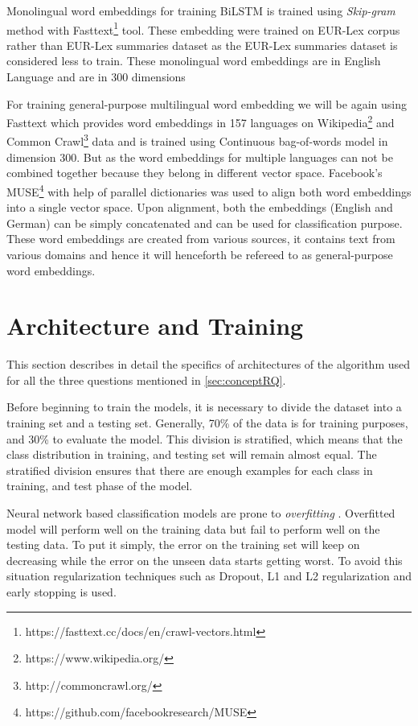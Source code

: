 Monolingual word embeddings for training \gls{BiLSTM} is trained using \textit{Skip-gram} method with Fasttext\footnote{https://fasttext.cc/docs/en/crawl-vectors.html}\cite{graves2009novel} tool. These embedding were trained on EUR-Lex corpus rather than EUR-Lex summaries dataset as the EUR-Lex summaries dataset is considered less to train. These monolingual word embeddings are in English Language and are in 300 dimensions

For training general-purpose multilingual word embedding we will be again using Fasttext which provides word embeddings in 157 languages on Wikipedia\footnote{https://www.wikipedia.org/} and Common Crawl\footnote{http://commoncrawl.org/} data and is trained using Continuous bag-of-words model in dimension 300. But as the word embeddings for multiple languages can not be combined together because they belong in different vector space. Facebook's MUSE\footnote{https://github.com/facebookresearch/MUSE} \cite{conneau2017word} with help of parallel dictionaries was used to align both word embeddings into a single vector space. Upon alignment, both the embeddings (English and German) can be simply concatenated and can be used for classification purpose. These word embeddings are created from various sources, it contains text from various domains and hence it will henceforth be refereed to as general-purpose word embeddings.

\clearpage

\section{Architecture and Training}
This section describes in detail the specifics of architectures of the algorithm used for all the three questions mentioned in \ref{sec:conceptRQ}.

Before beginning to train the models, it is necessary to divide the dataset into a training set and a testing set. Generally, 70\% of the data is for training purposes, and 30\% to evaluate the model. This division is stratified, which means that the class distribution in training, and testing set will remain almost equal. The stratified division ensures that there are enough examples for each class in training, and test phase of the model. 

Neural network based classification models are prone to \textit{overfitting} \cite{Prechelt1998}. Overfitted model will perform well on the training data but fail to perform well on the testing data. To put it simply, the error on the training set will keep on decreasing while the error on the unseen data starts getting worst. To avoid this situation regularization techniques such as Dropout, L1 and L2 regularization and early stopping is used.

